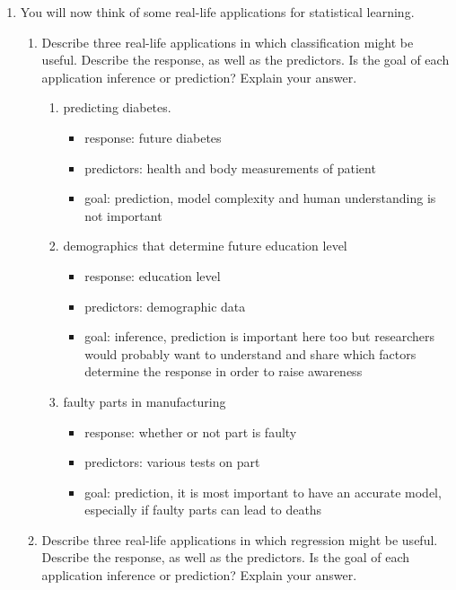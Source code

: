 \documentclass[]{book}
\providecommand{\tightlist}{%
  \setlength{\itemsep}{0pt}\setlength{\parskip}{0pt}}
\theoremstyle{definition}
\theoremstyle{definition}
\theoremstyle{definition}
\theoremstyle{remark}
\begin{document}
\begin{enumerate}
\def\labelenumi{\arabic{enumi}.}
\setcounter{enumi}{3}
\tightlist
\item
  You will now think of some real-life applications for statistical
  learning.

  \begin{enumerate}
  \def\labelenumii{(\alph{enumii})}
  \tightlist
  \item
    Describe three real-life applications in which classification might
    be useful. Describe the response, as well as the predictors. Is the
    goal of each application inference or prediction? Explain your
    answer.

    \begin{enumerate}
    \def\labelenumiii{\arabic{enumiii}.}
    \tightlist
    \item
      predicting diabetes.

      \begin{itemize}
      \tightlist
      \item
        response: future diabetes
      \item
        predictors: health and body measurements of patient
      \item
        goal: prediction, model complexity and human understanding is
        not important
      \end{itemize}
    \item
      demographics that determine future education level

      \begin{itemize}
      \tightlist
      \item
        response: education level
      \item
        predictors: demographic data
      \item
        goal: inference, prediction is important here too but
        researchers would probably want to understand and share which
        factors determine the response in order to raise awareness
      \end{itemize}
    \item
      faulty parts in manufacturing

      \begin{itemize}
      \tightlist
      \item
        response: whether or not part is faulty
      \item
        predictors: various tests on part
      \item
        goal: prediction, it is most important to have an accurate
        model, especially if faulty parts can lead to deaths
      \end{itemize}
    \end{enumerate}
  \item
    Describe three real-life applications in which regression might be
    useful. Describe the response, as well as the predictors. Is the
    goal of each application inference or prediction? Explain your
    answer.


\end{enumerate}
\end{enumerate}
\end{document}
